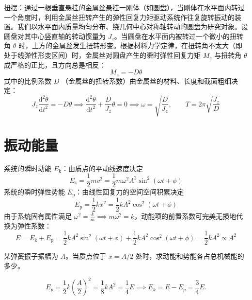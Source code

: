 \documentclass[lang=cn,11pt]{elegantbook}
\begin{document}
\begin{definition}[扭摆]
扭摆：通过一根垂直悬挂的金属丝悬挂一刚体（如圆盘），当刚体在水平面内转过一个角度时，利用金属丝扭转产生的弹性回复力矩驱动系统作往复旋转振动的装置。我们以水平面内质量均匀分布、绕几何中心对称轴转动的圆盘为研究对象。设圆盘对其中心竖直轴的转动惯量为 $J_z$。当圆盘在水平面内被转过一个微小的扭转角 $\theta$ 时，上方的金属丝发生扭转形变。根据材料力学定律，在扭转角不太大（即处于线弹性形变区间）时，金属丝对圆盘产生的瞬时弹性回复力矩 $M_z$ 与扭转角 $\theta$ 成严格的正比，且方向总是相反：$$M_z = -D\theta$$式中的比例系数 $D$ （金属丝的扭转系数）由金属丝的材料、长度和截面粗细决定：$$J_z \frac{\mathrm{d}^2\theta}{\mathrm{d}t^2} = -D\theta \implies \frac{\mathrm{d}^2\theta}{\mathrm{d}t^2} + \frac{D}{J_z}\theta = 0\implies\boxed{\omega = \sqrt{\frac{D}{J_z}}, \qquad T = 2\pi\sqrt{\frac{J_z}{D}}}$$
\end{definition}

\section{振动能量}

\begin{definition}[动能与势能]
系统的瞬时动能 $E_{\text{k}}$：由质点的平动线速度决定$$E_{\text{k}} = \frac{1}{2}m v^2 = \frac{1}{2}m\omega^2 A^2 \sin^2(\omega t + \phi)$$系统的瞬时弹性势能 $E_{\text{p}}$：由线性回复力的空间空间积累决定$$E_{\text{p}} = \frac{1}{2}k x^2 = \frac{1}{2}k A^2 \cos^2(\omega t + \phi)$$由于系统固有属性满足 $\omega^2 = \frac{k}{m} \implies m\omega^2 = k$，动能项的前置系数可完美无损地代换为弹性系数：$$E = E_{\text{k}} + E_{\text{p}} = \frac{1}{2}k A^2 \sin^2(\omega t + \phi) + \frac{1}{2}k A^2 \cos^2(\omega t + \phi) =\frac{1}{2}k A^2 \propto A^2$$
\end{definition}

\begin{exercise}[由位移判断能量分配]
某弹簧振子振幅为 \(A\)。当质点位于 \(x=A/2\) 处时，求动能和势能各占总机械能的多少。
\end{exercise}
\begin{solution}
 \[E_p=\frac{1}{2}k\left(\frac{A}{2}\right)^2=\frac{1}{8}kA^2=\frac{1}{4}E \implies E_k=E-E_p=\frac{3}{4}E.\]
\end{solution}
\end{document}
